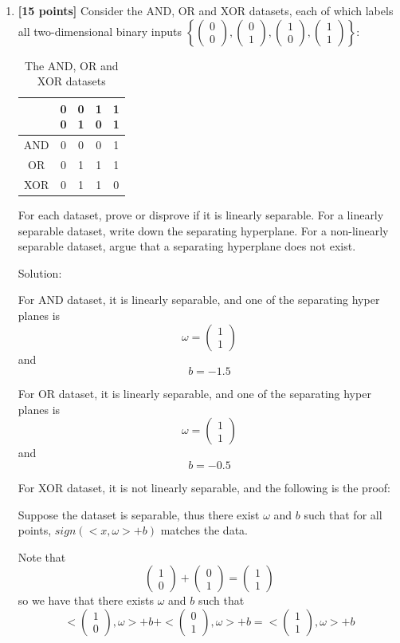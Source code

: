 \documentclass{article}
\newcommand{\mat}[1]{\ensuremath{\begin{pmatrix} #1 \end{pmatrix}}}
\begin{document}
\begin{enumerate}
    \item \textbf{[15 points]} Consider the AND, OR and XOR datasets, each of which labels all two-dimensional binary inputs $\left\{\mat{0\\0}, \mat{0\\1}, \mat{1\\0}, \mat{1\\1}\right\}$:

    \begin{table}[h]
        \centering
        \begin{tabular}{c|cccc}
             ~ & \mat{0\\0} & \mat{0\\1} & \mat{1\\0} & \mat{1\\1} \\
             \hline
             AND & 0 & 0 & 0 & 1 \\
             OR & 0 & 1 & 1 & 1 \\
             XOR & 0 & 1 & 1 & 0
             
             
        \end{tabular}
        \caption{The AND, OR and XOR datasets}
        \label{tab:xor}
    \end{table} 

    For each dataset, prove or disprove if it is linearly separable. For a linearly separable dataset, write down the separating hyperplane. For a non-linearly separable dataset, argue that a separating hyperplane does not exist.

    Solution: 

    For AND dataset, it is linearly separable, and one of the separating hyper planes is $$\omega =\mat{1\\1}$$ and $$b=-1.5$$

    For OR dataset, it is linearly separable, and one of the separating hyper planes is $$\omega = \mat{1\\1}$$ and $$b=-0.5$$

    For XOR dataset, it is not linearly separable, and the following is the proof:

    Suppose the dataset is separable, thus there exist $\omega$ and $b$ such that for all points, $sign(<x,\omega >+b)$ matches the data.
    
    Note that $$\mat{1\\0} + \mat{0\\1} = \mat{1\\1}$$ so we have that there exists $\omega$ and $b$ such that
    $$<\mat{1\\0},\omega >+b + <\mat{0\\1},\omega >+b = <\mat{1\\1},\omega >+b$$


\end{enumerate}
\end{document}
